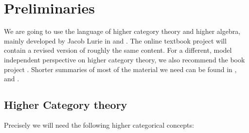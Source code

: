 \chapter{Preliminaries}
We are going to use the language of higher category theory and higher algebra, mainly developed by Jacob Lurie in \cite{HigherToposTheory} and \cite{lurie2017higher}. 
The online textbook project \cite{kerodon} will contain a revised version of roughly the same content. For a different, model independent perspective on higher category theory, we also recommend the book project \cite{RiehlVerityElements}.
 Shorter summaries of most of the material we need can be found in \cite{Grothshortcourse}, \cite{camarena2013whirlwind} and \cite{Gepnerintroductionhigher}.
\section{Higher Category theory}
Precisely we will need the following higher categorical concepts:



